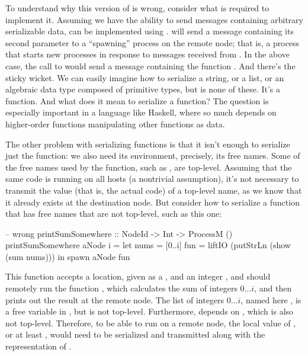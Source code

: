 \documentclass[preprint]{sigplanconf}
\begin{document}
To understand why this version of  is wrong, consider what is required to  implement it. Assuming we have the ability to send messages containing arbitrary serializable data,  can be implemented using .   will send a message containing its second parameter to a ``spawning'' process on the remote node; that is, a process that starts new processes in response to messages received from . In the above case, the call to  would send a message containing the function . And there's the sticky wicket. We can easily imagine how to serialize a string, or a list, or an algebraic data type composed of primitive types, but  is none of these. It's a function. And what does it mean to serialize a function? The question is especially important in a language like Haskell, where so much depends on higher-order functions manipulating other functions as data.

The other problem with serializing functions is that it isn't enough to serialize just the function: we also need its environment, precisely, its free names. Some of the free names used by the  function, such as , are top-level. Assuming that the same code is running on all hosts (a nontrivial assumption), it's not necessary to transmit the value (that is, the actual code) of a top-level name, as we know that it already exists at the destination node. But consider how to serialize a function that has free names that are not top-level, such as this one:

\begin{code}
-- wrong
printSumSomewhere :: NodeId -> Int -> ProcessM ()
printSumSomewhere aNode i =
  let nums = [0..i]
      fun = liftIO (putStrLn (show (sum nums)))
   in spawn aNode fun
\end{code}

This function accepts a location, given as a , and an integer , and should remotely run the function , which calculates the sum of integers $0 \ldots i$, and then prints out the result at the remote node. The list of integers $0 \ldots i$, named here , is a free variable in , but is not top-level. Furthermore,  depends on , which is also not top-level. Therefore, to be able to run  on a remote node, the local value of , or at least , would need to be serialized and transmitted along with the representation of .
\end{document}

